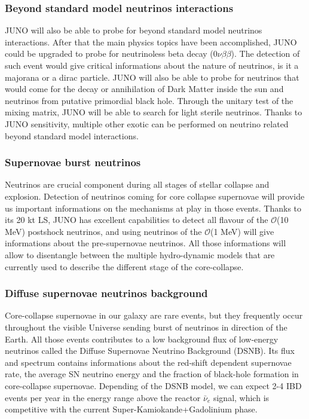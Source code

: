 \subsubsection{Beyond standard model neutrinos interactions}

JUNO will also be able to probe for beyond standard model neutrinos interactions. After that the main physics topics have been accomplished, JUNO could be upgraded to probe for neutrinoless beta decay ($0\nu\beta\beta$). The detection of such event would give critical informations about the nature of neutrinos, is it a majorana or a dirac particle. JUNO will also be able to probe for neutrinos that would come for the decay or annihilation of Dark Matter inside the sun and neutrinos from putative primordial black hole.
Through the unitary test of the mixing matrix, JUNO will be able to search for light sterile neutrinos.
Thanks to JUNO sensitivity, multiple other exotic can be performed on neutrino related beyond standard model interactions.

\subsubsection{Supernovae burst neutrinos}

Neutrinos are crucial component during all stages of stellar collapse and explosion. Detection of neutrinos coming for core collapse supernovae will provide us important informations on the mechanisms at play in those events.
Thanks to its 20 kt LS, JUNO has excellent capabilities to detect all flavour of the $\mathcal{O}$(10 MeV) postshock neutrinos, and using neutrinos of the $\mathcal{O}$(1 MeV) will give informations about the pre-supernovae neutrinos. All those informations will allow to disentangle between the multiple hydro-dynamic models that are currently used to describe the different stage of the core-collapse.

\subsubsection{Diffuse supernovae neutrinos background}

Core-collapse supernovae in our galaxy are rare events, but they frequently occur throughout the visible Universe sending burst of neutrinos in direction of the Earth. All those events contributes to a low background flux of low-energy neutrinos called the Diffuse Supernovae Neutrino Background (DSNB). Its flux and spectrum contains informations about the red-shift dependent supernovae rate, the average SN neutrino energy and the fraction of black-hole formation in core-collapse supernovae. Depending of the DSNB model, we can expect 2-4 IBD events per year in the energy range above the reactor $\bar{\nu}_e$ signal, which is competitive with the current Super-Kamiokande+Gadolinium phase.

